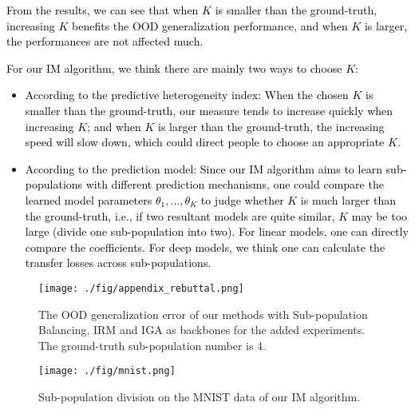 
\textcolor{black}{From the results, we can see that when $K$ is smaller than the ground-truth, increasing $K$ benefits the OOD generalization performance, and when $K$ is larger, the performances are not affected much.}

\textcolor{black}{For our IM algorithm, we think there are mainly two ways to choose $K$:}

\begin{itemize}
    \item \textcolor{black}{According to the predictive heterogeneity index: When the chosen $K$ is smaller than the ground-truth, our measure tends to increase quickly when increasing $K$; and when $K$ is larger than the ground-truth, the increasing speed will slow down, which could direct people to choose an appropriate $K$.}
    \item \textcolor{black}{According to the prediction model: Since our IM algorithm aims to learn sub-populations with different prediction mechanisms, one could compare the learned model parameters $\theta_1, \dots, \theta_K$ to judge whether $K$ is much larger than the ground-truth, i.e., if two resultant models are quite similar, $K$ may be too large (divide one sub-population into two). For linear models, one can directly compare the coefficients. For deep models, we think one can calculate the transfer losses across sub-populations.}
\end{itemize}




\begin{figure}[htbp]
\centering
\begin{minipage}{.55\textwidth}
  \centering
  \texttt{[image: ./fig/appendix\_rebuttal.png]}
  \caption{The OOD generalization error of our methods with Sub-population Balancing, IRM and IGA as backbones for the added experiments. The ground-truth sub-population number is 4.}
  \label{fig:appendix-rebuttal}
\end{minipage}%
\hfill
\begin{minipage}{.42\textwidth}
  \centering
  \texttt{[image: ./fig/mnist.png]}
  \caption{Sub-population division on the MNIST data of our IM algorithm.}
  \label{fig:test4}
\end{minipage}
\vskip -0.2in
\end{figure}


